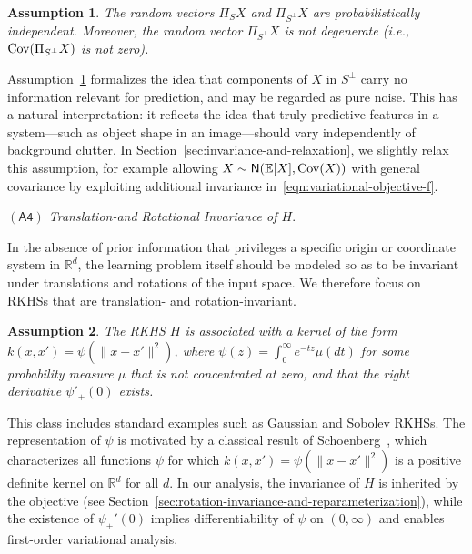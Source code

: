 \documentclass[sn-mathphys-num]{sn-jnl}%
\numberwithin{equation}{section}
\newcommand{\R}{\mathbb{R}}
\newcommand{\E}{\mathbb{E}}
\newcommand{\normal}{\mathsf{N}}  %
\newtheorem{assumption}{Assumption}[section]
\newcommand{\Cov}{{\rm Cov}}
\theoremstyle{thmstyleone}%
\theoremstyle{thmstyletwo}%
\theoremstyle{thmstylethree}%
\begin{document}
\vspace{.5em} 
\begin{assumption}
\label{assumption:independence}
The random vectors $\Pi_S X$ and $\Pi_{S^\perp} X$ are probabilistically independent.  
Moreover, the random vector $\Pi_{S^\perp} X$ is not degenerate (i.e., $\Cov(\Pi_{S^\perp} X)$ is not zero). 
\end{assumption} 
\vspace{.5em} 
Assumption~\ref{assumption:independence} formalizes the idea that components of
$X$ in $S^\perp$ carry no information relevant for prediction, and may be regarded as pure noise. 
This has a natural interpretation: it reflects the idea that truly
predictive features in a system---such as object shape in an image---should vary independently
of background clutter. In Section~\ref{sec:invariance-and-relaxation}, we slightly relax this assumption,
for example allowing $X \sim \normal(\E[X], \Cov(X))$ with general covariance by exploiting additional
invariance in~\eqref{eqn:variational-objective-f}.


\vspace{.8em}
\noindent\noindent
\emph{$\mathsf{(A4)}$ Translation-and Rotational Invariance of $H$}.  

\vspace{.3em} 
In the absence of prior information that privileges a specific origin or coordinate system in $\R^d$, the learning problem itself should be modeled so as to be invariant under translations and rotations of the input space. We therefore focus on RKHSs that are translation- and rotation-invariant.

\vspace{.5em} 
\begin{assumption} 
\label{assumption:symmetry-of-RKHS}
The RKHS $H$ is associated with a kernel of the form $k(x,x') = \psi(\|x-x'\|^2)$, where 
$\psi(z) = \int_0^\infty e^{-tz}\mu(dt)$ for some probability measure $\mu$ that is not concentrated at zero, 
and that the right derivative $\psi'_+(0)$ exists.
\end{assumption} 

\vspace{.5em} 
This class includes standard examples such as Gaussian and Sobolev RKHSs.
The representation of $\psi$ is motivated by a classical result of Schoenberg~\cite{Schoenberg38},
which characterizes all functions $\psi$ for which $k(x,x') = \psi(\|x - x'\|^2)$ 
is a positive definite kernel on $\R^d$ for all $d$.
In our analysis, the invariance of $H$ is inherited by the objective
(see Section~\ref{sec:rotation-invariance-and-reparameterization}), while the existence of $\psi_+'(0)$ 
implies differentiability of $\psi$ on $(0, \infty)$ and enables first-order variational analysis.
\end{document}
